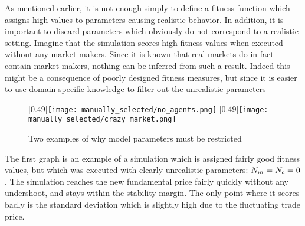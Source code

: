 As mentioned earlier, it is not enough simply to define a fitness function which assigns high values to parameters causing realistic behavior. In addition, it is important to discard parameters which obviously do not correspond to a realistic setting. Imagine that the simulation scores high fitness values when executed without any market makers. Since it is known that real markets do in fact contain market makers, nothing can be inferred from such a result. Indeed this might be a consequence of poorly designed fitness measures, but since it is easier to use domain specific knowledge to filter out the unrealistic parameters


\begin{figure}
		[0.49\linewidth]{\texttt{[image: manually\_selected/no\_agents.png]}}
	[0.49\linewidth]{\texttt{[image: manually\_selected/crazy\_market.png]}}
	\caption{Two examples of why model parameters must be restricted}
\end{figure}
The first graph is an example of a simulation which is assigned fairly good fitness values, but which was executed with clearly unrealistic parameters: $N_{m} = N_{c} = 0$. The simulation reaches the new fundamental price fairly quickly without any undershoot, and stays within the stability margin. The only point where it scores badly is the standard deviation which is slightly high due to the fluctuating trade price.

